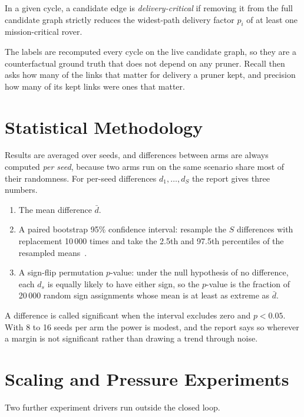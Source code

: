 \begin{definition}
In a given cycle, a candidate edge is \emph{delivery-critical} if removing it
from the full candidate graph strictly reduces the widest-path delivery
factor $p_i$ of at least one mission-critical rover.
\end{definition}

The labels are recomputed every cycle on the live candidate graph, so they are
a counterfactual ground truth that does not depend on any pruner. Recall then
asks how many of the links that matter for delivery a pruner kept, and
precision how many of its kept links were ones that matter.

\section{Statistical Methodology}

Results are averaged over seeds, and differences between arms are always
computed \emph{per seed}, because two arms run on the same scenario share
most of their randomness. For per-seed differences $d_1,\dots,d_S$ the report
gives three numbers.

\begin{enumerate}[label=\arabic*.]
\item The mean difference $\bar d$.
\item A paired bootstrap 95\% confidence interval: resample the $S$ differences
with replacement 10\,000 times and take the 2.5th and 97.5th percentiles of
the resampled means~\cite{efron1993}.
\item A sign-flip permutation $p$-value: under the null hypothesis of no
difference, each $d_s$ is equally likely to have either sign, so the
$p$-value is the fraction of 20\,000 random sign assignments whose mean is at
least as extreme as $\bar d$.
\end{enumerate}

A difference is called significant when the interval excludes zero and
$p<0.05$. With 8 to 16 seeds per arm the power is modest, and the report
says so wherever a margin is not significant rather than drawing a trend
through noise.

\section{Scaling and Pressure Experiments}

Two further experiment drivers run outside the closed loop.

